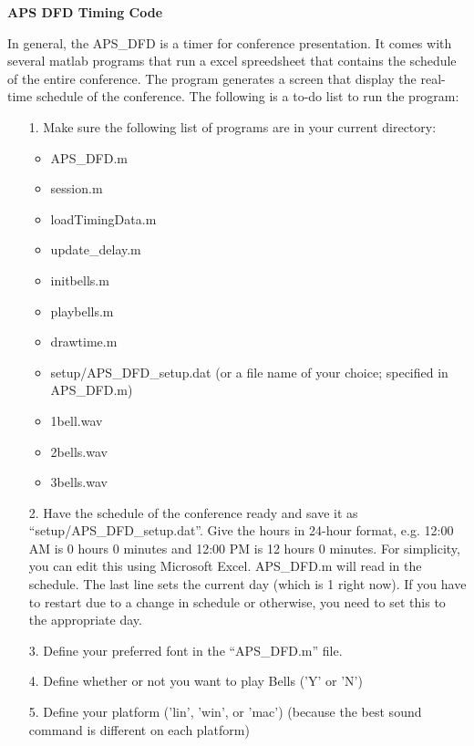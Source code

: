 \documentclass[12pt]{article}
\begin{document}
\begin{center}
{\large \bf APS DFD Timing Code}
\\[0.05cm]
\end{center}


\noindent  In general, the APS\_DFD is a timer for conference presentation.  It comes with several matlab programs that run a excel spreedsheet that contains the schedule of the entire conference.  The program generates a screen that display the real-time schedule of the conference.  The following is a to-do list to run the program:

\begin{itemize}
 \item[1.]  Make sure the following list of programs are in your current directory:
 \begin{itemize}
  \item APS\_DFD.m
  \item session.m
  \item loadTimingData.m
  \item update\_delay.m
  \item initbells.m
  \item playbells.m
  \item drawtime.m
  \item setup/APS\_DFD\_setup.dat (or a file name of your choice; specified in APS\_DFD.m)
  \item 1bell.wav
  \item 2bells.wav
  \item 3bells.wav
 \end{itemize}

 \item[2.]  Have the schedule of the conference ready and save it as ``setup/APS\_DFD\_setup.dat''.  Give the hours in 24-hour format, e.g. 12:00 AM is 0 hours 0 minutes and 12:00 PM is 12 hours 0 minutes.  For simplicity, you can edit this using Microsoft Excel.  APS\_DFD.m will read in the schedule.  The last line sets the current day (which is 1 right now).  If you have to restart due to a change in schedule or otherwise, you need to set this to the appropriate day.
 \item[3.]  Define your preferred font in the ``APS\_DFD.m'' file.
 \item[4.]  Define whether or not you want to play Bells ('Y' or 'N')
 \item[5.]  Define your platform ('lin', 'win', or 'mac') (because the best sound command is different on each platform)


\end{itemize}
\end{document}
